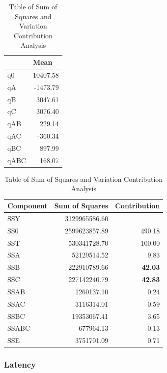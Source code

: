 \documentclass[11pt,a4paper]{article}
\begin{document}
\begin{table}[H]
	\begin{minipage}{.5\linewidth}
	\caption{Table of q values}
	\centering
	\begin{tabular}{|l|r|}
		\hline
		& \multicolumn{1}{l|}{Mean} \\ \hline
		q0 & 10407.58 \\ \hline
		qA & -1473.79 \\ \hline
		qB & 3047.61 \\ \hline
		qC & 3076.40 \\ \hline
		qAB & 229.14 \\ \hline
		qAC & -360.34 \\ \hline
		qBC & 897.99 \\ \hline
		qABC & 168.07 \\ \hline
	\end{tabular}		
	\end{minipage}%
	\begin{minipage}{.5\linewidth}
	\caption{Table of Sum of Squares and Variation Contribution Analysis}
	\centering
	\begin{tabular}{|l|r|r|}
		\hline
		Component & \multicolumn{1}{l|}{Sum of Squares} & \multicolumn{1}{l|}{Contribution} \\ \hline
		SSY & 3129965586.60 & \multicolumn{1}{l|}{} \\ \hline
		SS0 & 2599623857.89 & 490.18 \\ \hline
		SST & 530341728.70 & 100.00 \\ \hline
		SSA & 52129514.52 & 9.83 \\ \hline
		SSB & 222910789.66 & \textbf{42.03} \\ \hline
		SSC & 227142240.79 & \textbf{42.83} \\ \hline
		SSAB & 1260137.10 & 0.24 \\ \hline
		SSAC & 3116314.01 & 0.59 \\ \hline
		SSBC & 19353067.41 & 3.65 \\ \hline
		SSABC & 677964.13 & 0.13 \\ \hline
		SSE & 3751701.09 & 0.71 \\ \hline
	\end{tabular}		
	\end{minipage} 
\end{table}

\subsubsection{Latency}
\end{document}
